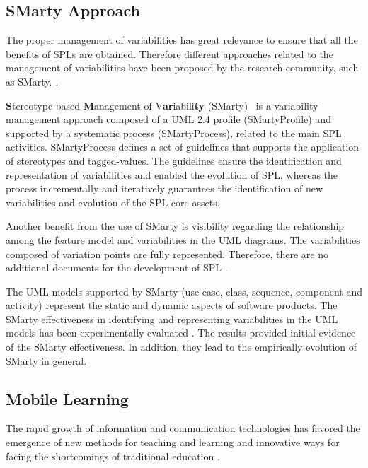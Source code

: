\subsection{SMarty Approach}


The proper management of variabilities has great relevance to ensure that all the benefits of SPLs are obtained. Therefore different approaches related to the management of variabilities have been proposed by the research community, such as SMarty.  \cite{chen11,capilla13}.  

\textbf{S}tereotype-based \textbf{M}anagement of V\textbf{ar}iabili\textbf{ty} (SMarty)~\cite{oliveirajr10} is a variability management approach composed of a UML 2.4 profile (SMartyProfile) and supported by a systematic process (SMartyProcess), related to the main SPL activities. SMartyProcess defines a set of guidelines that supports the application of stereotypes and tagged-values. The guidelines ensure the identification and representation of variabilities and enabled the evolution of SPL, whereas the process incrementally and iteratively guarantees the identification of new variabilities and evolution of the SPL core assets.

Another benefit from the use of SMarty is visibility regarding the relationship among the feature model and variabilities in the UML diagrams. The variabilities composed of variation points are fully represented. Therefore, there are no additional documents for the development of SPL \cite{oliveirajr10}.

The UML models supported by SMarty (use case, class, sequence, component and activity) represent the static and dynamic aspects of software products. The SMarty effectiveness in identifying and representing variabilities in the UML models has been experimentally evaluated \cite{marcolino13,marcolino14a,marcolino14b,bera15}. The results provided initial evidence of the SMarty effectiveness. In addition, they lead to the empirically evolution of SMarty in general.

\subsection{Mobile Learning}

The rapid growth of information and communication technologies has favored the emergence of new methods for teaching and learning and innovative ways for facing the shortcomings of traditional education \cite{west12}. 

